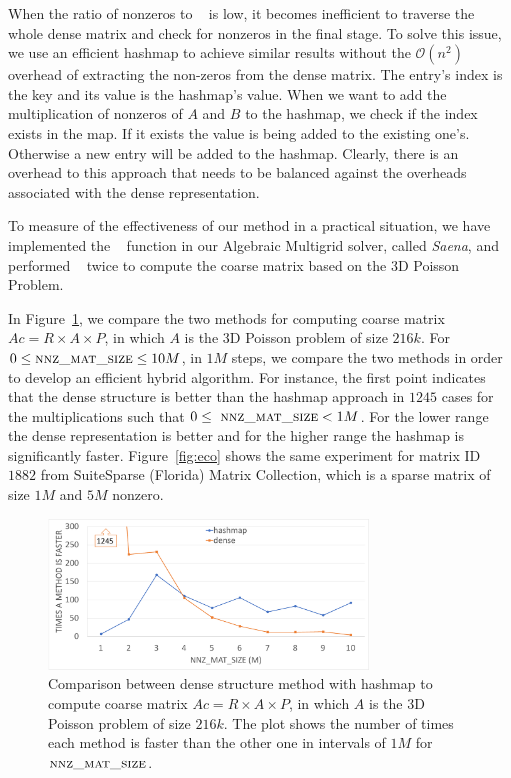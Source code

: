 When the ratio of nonzeros to \nnzsz~ is low, it becomes inefficient to traverse the whole dense matrix and check for nonzeros in the final stage. To solve this issue, we use an efficient hashmap to achieve similar results without the $\mathcal{O}(n^2)$ overhead of extracting the non-zeros from the dense matrix. The entry's index is the key and its value is the hashmap's value. When we want to add the multiplication of nonzeros of $A$ and $B$ to the hashmap, we check if the index exists in the map. If it exists the value is being added to the existing one's. Otherwise a new entry will be added to the hashmap. Clearly, there is an overhead to this approach that needs to be balanced against the overheads associated with the dense representation. 

To measure of the effectiveness of our method in a practical situation, we have implemented the \recmm~ function in our Algebraic Multigrid solver, called \textit{Saena}, and performed \mm~ twice to compute the coarse matrix based on the 3D Poisson Problem.

In Figure~\ref{fig:lap60}, we compare the two methods for computing coarse matrix $Ac = R \times A \times P$, in which $A$ is the 3D Poisson problem of size $216k$. For $0 \leq \textsc{nnz\_mat\_size} \leq 10M$, in $1M$ steps, we compare the two methods in order to develop an efficient hybrid algorithm. For instance, the first point indicates that the dense structure is better than the hashmap approach in $1245$ cases for the multiplications such that $0 \le\ \textsc{nnz\_mat\_size} < 1M$. For the lower range the dense representation is better and for the higher range the hashmap is significantly faster. Figure~\ref{fig:eco} shows the same experiment for matrix ID $1882$ from SuiteSparse (Florida) Matrix Collection, which is a sparse matrix of size $1M$ and $5M$ nonzero.

\begin{figure}[tbh]
 \centering
 \includegraphics[width=8.5cm,height=4cm]{./figures/lap60_range.pdf}
 \caption{Comparison between dense structure method with hashmap to compute coarse matrix $Ac = R \times A \times P$, in which $A$ is the 3D Poisson problem of size $216k$. The plot shows the number of times each method is faster than the other one in intervals of $1M$ for $\textsc{nnz\_mat\_size}$.}
 \label{fig:lap60}
 \Description{}
\end{figure}


